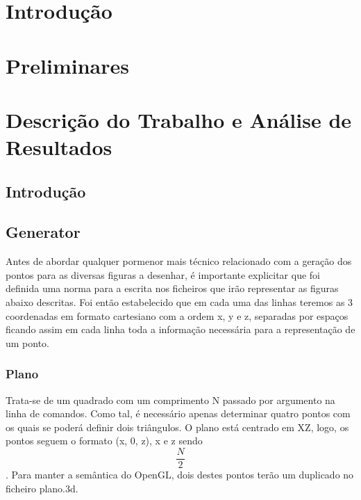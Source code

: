 \documentclass[a4paper]{article}
\begin{document}
\section{Introdução}


\section{Preliminares}


\section{Descrição do Trabalho e Análise de Resultados}

\subsection{Introdução}



\subsection{Generator}

\hspace{3mm} Antes de abordar qualquer pormenor mais técnico relacionado com a geração dos pontos para as diversas figuras a desenhar, é importante explicitar que foi definida uma norma para a escrita nos ficheiros que irão representar as figuras abaixo descritas. Foi então estabelecido que em cada uma das linhas teremos as 3 coordenadas em formato cartesiano com a ordem x, y e z, separadas por espaços ficando assim em cada linha toda a informação necessária para a representação de um ponto.

\subsubsection{Plano} %

\hspace{3mm} Trata-se de um quadrado com um comprimento N passado por argumento na linha de comandos. Como tal, é necessário apenas determinar quatro pontos com os quais se poderá definir dois triângulos. O plano está centrado em XZ, logo, os pontos seguem o formato (x, 0, z), x e z sendo \pm \[\frac{N}{2}\]. Para manter a semântica do OpenGL, dois destes pontos terão um duplicado no ficheiro plano.3d. %
\end{document}
